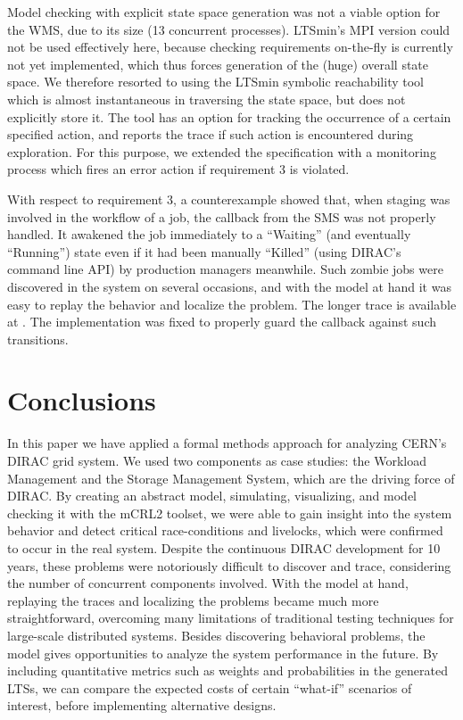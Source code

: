 \documentclass[10pt,conference]{IEEEtran}
\begin{document}
Model checking with explicit state space generation was not a viable option for the WMS, due to its size (13 concurrent processes).
LTSmin's \cite{LTSmin} MPI version could not be used effectively here, because checking requirements on-the-fly
is currently not yet implemented, which thus forces generation of the (huge) overall state space.
We therefore resorted to using the LTSmin symbolic reachability tool which 
is almost instantaneous in traversing the state space, but does not
explicitly store it.
The tool has an option for tracking the occurrence of a certain specified action, and
reports the trace if such action is encountered during exploration. 
For this purpose, we extended the specification 
with a monitoring process which fires an error action if requirement 3 is
violated.

With respect to requirement 3, a counterexample showed that, when 
staging was involved in the workflow of a job, the callback from
the SMS was not properly handled.
It awakened the job immediately to a ``Waiting'' (and eventually ``Running'') state
even if it had been manually ``Killed'' 
(using DIRAC's command line API) by production managers meanwhile. Such zombie jobs
were discovered in the system on several occasions,
and with the model at hand it was easy to replay the behavior and localize the
problem. The longer trace is available at \cite{svn_mcrl2}. The implementation
was fixed to properly guard the callback against such transitions.


\section{Conclusions}
\label{sec:Section_5}
In this paper we have applied a formal methods approach for analyzing CERN's 
DIRAC grid system. 
We used two components as case studies: the Workload
Management and the Storage Management System, which are the driving force 
of DIRAC.
By creating an abstract model, simulating, visualizing, and model checking it with the mCRL2 toolset,
we were able to gain insight into the system behavior and detect critical
race-conditions and livelocks, which  
were confirmed to occur in the real system. 
Despite the continuous DIRAC development for 10 years, these problems 
were notoriously difficult to discover and trace, considering the number of concurrent components involved. 
With the model at hand, replaying
the traces and localizing the problems became much more straightforward, overcoming many limitations of
traditional testing techniques for large-scale distributed systems. Besides 
discovering behavioral problems, the 
model gives opportunities to analyze the system performance in the future.
By including quantitative metrics such as weights and probabilities in the generated LTSs,
we can compare the expected costs of certain ``what-if'' scenarios 
of interest, before implementing alternative designs.
\end{document}
